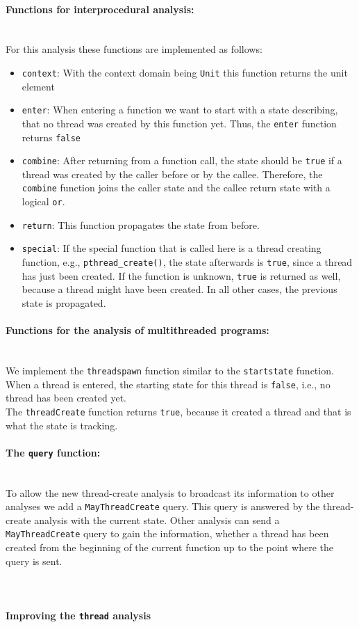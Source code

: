     \paragraph{Functions for interprocedural analysis:}\mbox{}\\
    For this analysis these functions are implemented as follows:
    \begin{itemize}
      \item \texttt{context}: With the context domain being \texttt{Unit} this function returns the unit element
      \item \texttt{enter}: When entering a function we want to start with a state describing, that no thread was created by this function yet. Thus, the \texttt{enter} function returns \texttt{false}
      \item \texttt{combine}: After returning from a function call, the state should be \texttt{true} if a thread was created by the caller before or by the callee. Therefore, the \texttt{combine} function joins the caller state and the callee return state with a logical \texttt{or}. 
      \item \texttt{return}: This function propagates the state from before.
      \item \texttt{special}: If the special function that is called here is a thread creating function, e.g., \texttt{pthread\_create()}, the state afterwards is \texttt{true}, since a thread has just been created. If the function is unknown, \texttt{true} is returned as well, because a thread might have been created. In all other cases, the previous state is propagated. 
    \end{itemize}

    \paragraph{Functions for the analysis of multithreaded programs:}\mbox{}\\
    We implement the \texttt{threadspawn} function similar to the \texttt{startstate} function. When a thread is entered, the starting state for this thread is \texttt{false}, i.e., no thread has been created yet.\\
    The \texttt{threadCreate} function returns \texttt{true}, because it created a thread and that is what the state is tracking.

    \paragraph{The \texttt{query} function:}\mbox{}\\
    To allow the new thread-create analysis to broadcast its information to other analyses we add a \texttt{MayThreadCreate} query. This query is answered by the thread-create analysis with the current state. Other analysis can send a \texttt{MayThreadCreate} query to gain the information, whether a thread has been created from the beginning of the current function up to the point where the query is sent.\\
    \\
    \\
    \paragraph{Improving the \texttt{thread} analysis}

